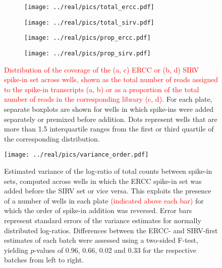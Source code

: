\documentclass{article}
\newcommand\revised[1]{\textcolor{red}{#1}}
\begin{document}
\begin{figure}[btp]
    \begin{center}
        \begin{subfigure}{0.49\textwidth}
            \texttt{[image: ../real/pics/total\_ercc.pdf]}
            \caption{}
        \end{subfigure}
        \begin{subfigure}{0.49\textwidth}
            \texttt{[image: ../real/pics/total\_sirv.pdf]}
            \caption{}
        \end{subfigure}
        \begin{subfigure}{0.49\textwidth}
            \texttt{[image: ../real/pics/prop\_ercc.pdf]}
            \caption{}
        \end{subfigure}
        \begin{subfigure}{0.49\textwidth}
            \texttt{[image: ../real/pics/prop\_sirv.pdf]}
            \caption{}
        \end{subfigure}
    \end{center}
    \caption{\revised{Distribution of the coverage of the (a, c) ERCC or (b, d) SIRV spike-in set across wells, 
        shown as the total number of reads assigned to the spike-in transcripts (a, b) or as a proportion of the total number of reads in the corresponding library (c, d).}
        For each plate, separate boxplots are shown for wells in which spike-ins were added separately or premixed before addition.
        Dots represent wells that are more than 1.5 interquartile ranges from the first or third quartile of the corresponding distribution.
    }
    \label{fig:totals}
\end{figure}

\begin{figure}[btp]
    \begin{center}
        \texttt{[image: ../real/pics/variance\_order.pdf]}
    \end{center}
    \caption{Estimated variance of the log-ratio of total counts between spike-in sets, computed across wells in which the ERCC spike-in set was added before the SIRV set or vice versa.
        This exploits the presence of a number of wells in each plate \revised{(indicated above each bar)} for which the order of spike-in addition was reversed.
        Error bars represent standard errors of the variance estimates for normally distributed log-ratios.
        Differences between the ERCC- and SIRV-first estimates of each batch were assessed using a two-sided F-test, yielding $p$-values of 0.96, 0.66, 0.02 and 0.33 for the respective batches from left to right.
    }
\end{figure}
\end{document}
